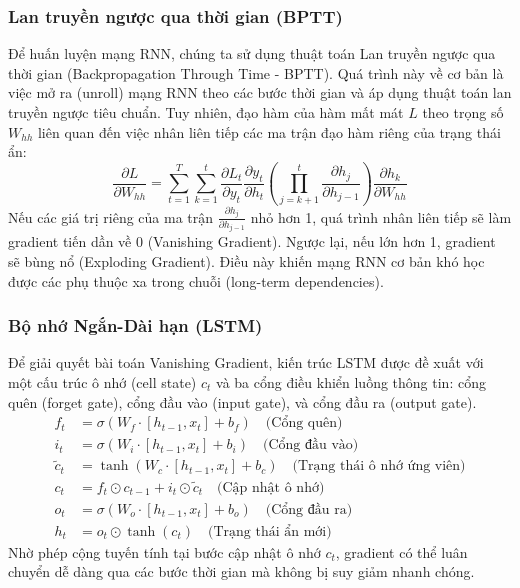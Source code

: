\subsubsection{Lan truyền ngược qua thời gian (BPTT)}
Để huấn luyện mạng RNN, chúng ta sử dụng thuật toán Lan truyền ngược qua thời gian (Backpropagation Through Time - BPTT). Quá trình này về cơ bản là việc mở ra (unroll) mạng RNN theo các bước thời gian và áp dụng thuật toán lan truyền ngược tiêu chuẩn. Tuy nhiên, đạo hàm của hàm mất mát $L$ theo trọng số $W_{hh}$ liên quan đến việc nhân liên tiếp các ma trận đạo hàm riêng của trạng thái ẩn:
\begin{equation}
    \frac{\partial L}{\partial W_{hh}} = \sum_{t=1}^T \sum_{k=1}^t \frac{\partial L_t}{\partial y_t} \frac{\partial y_t}{\partial h_t} \left( \prod_{j=k+1}^t \frac{\partial h_j}{\partial h_{j-1}} \right) \frac{\partial h_k}{\partial W_{hh}}
\end{equation}
Nếu các giá trị riêng của ma trận $\frac{\partial h_j}{\partial h_{j-1}}$ nhỏ hơn 1, quá trình nhân liên tiếp sẽ làm gradient tiến dần về 0 (Vanishing Gradient). Ngược lại, nếu lớn hơn 1, gradient sẽ bùng nổ (Exploding Gradient). Điều này khiến mạng RNN cơ bản khó học được các phụ thuộc xa trong chuỗi (long-term dependencies).

\subsubsection{Bộ nhớ Ngắn-Dài hạn (LSTM)}
Để giải quyết bài toán Vanishing Gradient, kiến trúc LSTM được đề xuất với một cấu trúc ô nhớ (cell state) $c_t$ và ba cổng điều khiển luồng thông tin: cổng quên (forget gate), cổng đầu vào (input gate), và cổng đầu ra (output gate).
\begin{align}
    f_t &= \sigma(W_f \cdot [h_{t-1}, x_t] + b_f) \quad \text{(Cổng quên)} \\
    i_t &= \sigma(W_i \cdot [h_{t-1}, x_t] + b_i) \quad \text{(Cổng đầu vào)} \\
    \tilde{c}_t &= \tanh(W_c \cdot [h_{t-1}, x_t] + b_c) \quad \text{(Trạng thái ô nhớ ứng viên)} \\
    c_t &= f_t \odot c_{t-1} + i_t \odot \tilde{c}_t \quad \text{(Cập nhật ô nhớ)} \\
    o_t &= \sigma(W_o \cdot [h_{t-1}, x_t] + b_o) \quad \text{(Cổng đầu ra)} \\
    h_t &= o_t \odot \tanh(c_t) \quad \text{(Trạng thái ẩn mới)}
\end{align}
Nhờ phép cộng tuyến tính tại bước cập nhật ô nhớ $c_t$, gradient có thể luân chuyển dễ dàng qua các bước thời gian mà không bị suy giảm nhanh chóng.

